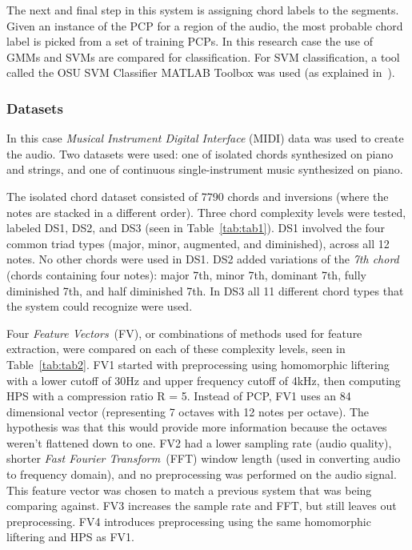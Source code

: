 \documentclass{sig-alternate}
\begin{document}

The next and final step in this system is assigning chord labels to the segments. Given an instance of the PCP for a region of the audio, the most probable chord label is picked from a set of training PCPs. In this research case the use of GMMs and SVMs are compared for classification. For SVM classification, a tool called the OSU SVM Classifier MATLAB Toolbox was used (as explained in~\cite{Morman:2006}).

\subsubsection{Datasets}

In this case \textit{Musical Instrument Digital Interface} (MIDI) data was used to create the audio. Two datasets were used: one of isolated chords synthesized on piano and strings, and one of continuous single-instrument music synthesized on piano. 

The isolated chord dataset consisted of 7790 chords and inversions (where the notes are stacked in a different order). Three chord complexity levels were tested, labeled DS1, DS2, and DS3 (seen in Table~\ref{tab:tab1}). DS1 involved the four common triad types (major, minor, augmented, and diminished), across all 12 notes. No other chords were used in DS1. DS2 added variations of the \textit{7th chord} (chords containing four notes): major 7th, minor 7th, dominant 7th, fully diminished 7th, and half diminished 7th. In DS3 all 11 different chord types that the system could recognize were used.

Four \textit{Feature Vectors}~(FV), or combinations of methods used for feature extraction, were compared on each of these complexity levels, seen in Table~\ref{tab:tab2}. FV1 started with preprocessing using homomorphic liftering with a lower cutoff of 30Hz and upper frequency cutoff of 4kHz, then computing HPS with a compression ratio R = 5. Instead of PCP, FV1 uses an 84 dimensional vector (representing 7 octaves with 12 notes per octave). The hypothesis was that this would provide more information because the octaves weren't flattened down to one. FV2 had a lower sampling rate (audio quality), shorter \textit{Fast Fourier Transform}~(FFT) window length (used in converting audio to frequency domain), and no preprocessing was performed on the audio signal. This feature vector was chosen to match a previous system that was being comparing against. FV3 increases the sample rate and FFT, but still leaves out preprocessing. FV4 introduces preprocessing using the same homomorphic liftering and HPS as FV1.
\end{document}
